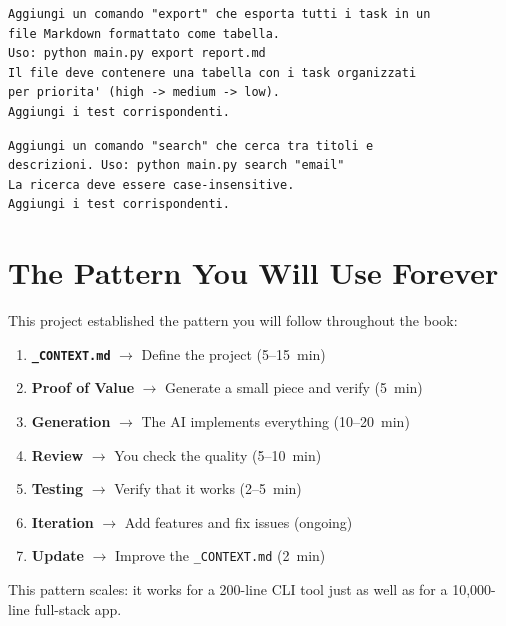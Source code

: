 \begin{praticabox}[title={Hands-on --- Export to Markdown format}]
\begin{lstlisting}[language={}]
Aggiungi un comando "export" che esporta tutti i task in un
file Markdown formattato come tabella.
Uso: python main.py export report.md
Il file deve contenere una tabella con i task organizzati
per priorita' (high -> medium -> low).
Aggiungi i test corrispondenti.
\end{lstlisting}
\end{praticabox}

\begin{praticabox}[title={Hands-on --- Text search}]
\begin{lstlisting}[language={}]
Aggiungi un comando "search" che cerca tra titoli e
descrizioni. Uso: python main.py search "email"
La ricerca deve essere case-insensitive.
Aggiungi i test corrispondenti.
\end{lstlisting}
\end{praticabox}

\section{The Pattern You Will Use Forever}

This project established the pattern you will follow throughout the book:

\begin{enumerate}
  \item \textbf{\texttt{\_CONTEXT.md}} $\rightarrow$ Define the project (5--15~min)
  \item \textbf{Proof of Value} $\rightarrow$ Generate a small piece and verify (5~min)
  \item \textbf{Generation} $\rightarrow$ The AI implements everything (10--20~min)
  \item \textbf{Review} $\rightarrow$ You check the quality (5--10~min)
  \item \textbf{Testing} $\rightarrow$ Verify that it works (2--5~min)
  \item \textbf{Iteration} $\rightarrow$ Add features and fix issues (ongoing)
  \item \textbf{Update} $\rightarrow$ Improve the \texttt{\_CONTEXT.md} (2~min)
\end{enumerate}

This pattern scales: it works for a 200-line CLI tool just as well as for a 10,000-line full-stack app.

